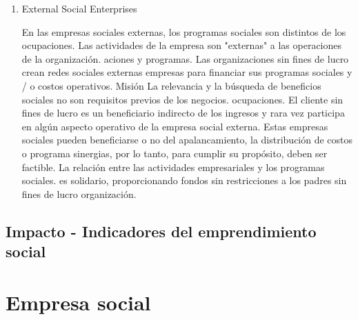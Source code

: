 \documentclass{memoir}
\begin{document}
\begin{enumerate}
\item External Social Enterprises
\label{sec:orgd6ea4dd}

En las empresas sociales externas, los programas sociales son distintos de los
ocupaciones. Las actividades de la empresa son "externas" a las operaciones de la organización.
aciones y programas. Las organizaciones sin fines de lucro crean redes sociales externas
empresas para financiar sus programas sociales y / o costos operativos. Misión
La relevancia y la búsqueda de beneficios sociales no son requisitos previos de los negocios.
ocupaciones. El cliente sin fines de lucro es un beneficiario indirecto de los ingresos y
rara vez participa en algún aspecto operativo de la empresa social externa.
Estas empresas sociales pueden beneficiarse o no del apalancamiento, la distribución de costos
o programa sinergias, por lo tanto, para cumplir su propósito, deben ser
factible. La relación entre las actividades empresariales y los programas sociales.
es solidario, proporcionando fondos sin restricciones a los padres sin fines de lucro
organización.
\end{enumerate}

\subsection{Impacto - Indicadores del emprendimiento social}
\label{sec:org09e08a8}


\section{Empresa social}
\label{sec:orgceece02}
\end{document}
